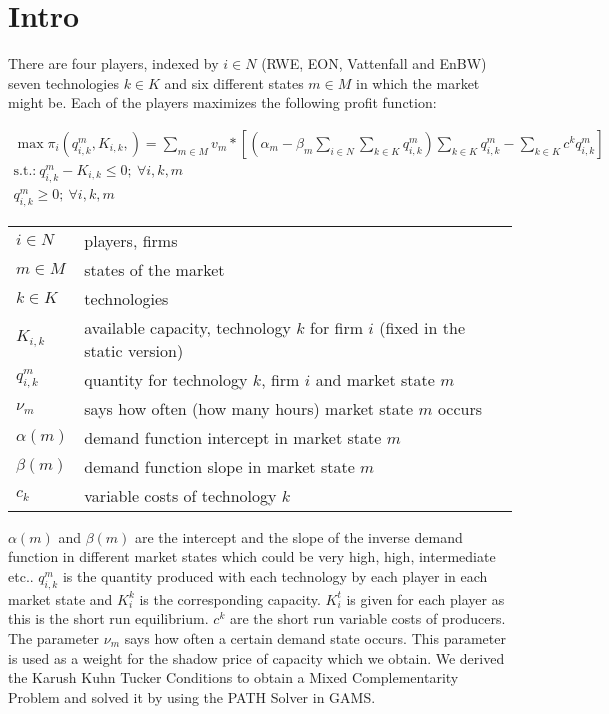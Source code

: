 \documentclass[a4paper,12pt]{article}
\theoremstyle{remark}
\begin{document}
  \section{Intro}

There are four players, indexed by $i\in N$ (RWE, EON, Vattenfall and EnBW) seven technologies $k\in K$  and six different states $m\in M$ in which the market might be. Each of the players maximizes the following profit function:

\begin{gather}
	\max \pi_i(q_{i,k}^m,K_{i,k},)= \sum_{m\in M} v_m * \left[(\alpha_m-\beta_m\sum_{i\in N} \sum_{k\in K} q_{i,k}^m ) \sum_{k\in K} q_{i,k}^m - \sum_{k\in K} c^k q_{i,k}^m \right] \\
			\text{s.t.:} \  q_{i,k}^m-K_{i,k} \leq 0;\  \forall i,k,m \\  \nonumber
 										  q_{i,k}^m	\geq 0; \ \forall i,k,m   \nonumber
\end{gather}

\begin{longtable}[c]{l l}
$i\in N$                           	& players, firms\\
$m\in M$													 	& states of the market \\
$k\in K$													 	& technologies \\
$K_{i,k}$                           & available capacity, technology $k$ for firm $i$ (fixed in the static version) \\
$q_{i,k}^{m}$										    & quantity for technology $k$, firm $i$ and market state $m$ \\			
$\nu_m $												  	& says how often (how many hours) market state $m$ occurs \\
$\alpha(m)$													& demand function intercept in market state $m$ \\
$\beta(m)$													& demand function slope in market state $m$ \\
$c_k$																& variable costs of technology $k$	\\
\end{longtable}


$\alpha(m)$ and $\beta(m)$ are the intercept and the slope of the inverse demand function in different market states which could be very high, high, intermediate etc.. $q_{i,k}^m$ is the quantity produced with each technology by each player in each market state and $K_i^k$ is the corresponding capacity. $K_i^t$ is given for each player as this is the short run equilibrium. $c^k$ are the short run variable costs of producers. The parameter $\nu_m $ says how often a certain demand state occurs. This parameter is used as a weight for the shadow price of capacity which we obtain. We derived the Karush Kuhn Tucker Conditions to obtain a Mixed Complementarity Problem and solved it by using the PATH Solver in GAMS.
\end{document}
